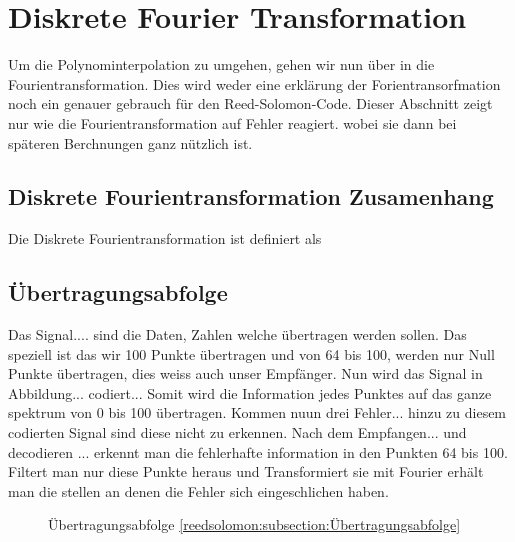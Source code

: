%
%
%
\section{Diskrete Fourier Transformation
\label{reedsolomon:section:dtf}}
Um die Polynominterpolation zu umgehen, gehen wir nun über in die Fourientransformation.
Dies wird weder eine erklärung der Forientransorfmation noch ein genauer gebrauch
für den Reed-Solomon-Code. Dieser Abschnitt zeigt nur wie die Fourientransformation auf Fehler reagiert.
wobei sie dann bei späteren Berchnungen ganz nützlich ist.

\subsection{Diskrete Fourientransformation Zusamenhang
\label{reedsolomon:subsection:dtfzusamenhang}}
Die Diskrete Fourientransformation ist definiert als

\subsection{Übertragungsabfolge
\label{reedsolomon:subsection:Übertragungsabfolge}}
Das Signal.... sind die Daten, Zahlen welche übertragen werden sollen.
Das speziell ist das wir 100 Punkte übertragen und von 64 bis 100,
werden nur Null Punkte übertragen, dies weiss auch unser Empfänger.
Nun wird das Signal in Abbildung... codiert...
Somit wird die Information jedes Punktes auf das ganze spektrum von 0 bis 100 übertragen.
Kommen nuun drei Fehler... hinzu zu diesem codierten Signal sind diese nicht zu erkennen.
Nach dem Empfangen... und decodieren ... erkennt man die fehlerhafte information in den Punkten 64 bis 100.
Filtert man nur diese Punkte heraus und Transformiert sie mit Fourier erhält man die stellen an denen die Fehler sich eingeschlichen haben.

\begin{figure}
	\centering
	\caption{Übertragungsabfolge \ref{reedsolomon:subsection:Übertragungsabfolge}}
	\label{fig:sendorder}
\end{figure}